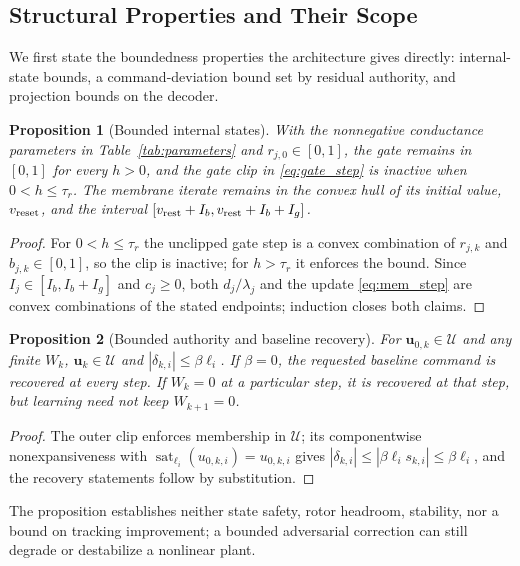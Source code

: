 \documentclass[letterpaper, 10 pt, conference]{ieeeconf}
\newcommand{\sat}{\operatorname{sat}}
\newtheorem{proposition}{Proposition}
\begin{document}
\subsection{Structural Properties and Their Scope}
We first state the boundedness properties the architecture gives directly: internal-state bounds, a command-deviation bound set by residual authority, and projection bounds on the decoder.
\begin{proposition}[Bounded internal states]
\label{prop:states}
With the nonnegative conductance parameters in Table~\ref{tab:parameters}
and $r_{j,0}\in[0,1]$, the gate remains in $[0,1]$ for every $h>0$, and the
gate clip in \eqref{eq:gate_step} is inactive when $0<h\le\tau_r$.
The membrane iterate remains in the convex hull of its initial value,
$v_{\rm reset}$, and the interval
$[v_{\rm rest}+I_b,v_{\rm rest}+I_b+I_g]$.
\end{proposition}
\begin{proof}
For $0<h\le\tau_r$ the unclipped gate step is a convex combination of
$r_{j,k}$ and $b_{j,k}\in[0,1]$, so the clip is inactive; for $h>\tau_r$ it
enforces the bound. Since $I_j\in[I_b,I_b+I_g]$ and $c_j\ge0$, both
$d_j/\lambda_j$ and the update \eqref{eq:mem_step} are convex combinations
of the stated endpoints; induction closes both claims.
\end{proof}

\begin{proposition}[Bounded authority and baseline recovery]
\label{prop:authority}
For $\bm u_{0,k}\in\mathcal U$ and any finite $W_k$,
$\bm u_k\in\mathcal U$ and $|\delta_{k,i}|\le\beta\ell_i$.
If $\beta=0$, the requested baseline command is recovered at every step.
If $W_k=0$ at a particular step, it is recovered at that step, but learning
need not keep $W_{k+1}=0$.
\end{proposition}
\begin{proof}
The outer clip enforces membership in $\mathcal U$; its componentwise
nonexpansiveness with $\sat_{\ell_i}(u_{0,k,i})=u_{0,k,i}$ gives
$|\delta_{k,i}|\le|\beta\ell_i s_{k,i}|\le\beta\ell_i$, and the recovery
statements follow by substitution.
\end{proof}
The proposition establishes neither state safety, rotor headroom, stability,
nor a bound on tracking improvement; a bounded adversarial correction can
still degrade or destabilize a nonlinear plant.
\end{document}
